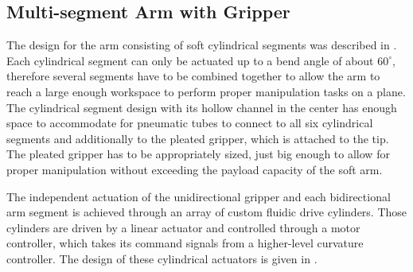 \subsection{Multi-segment Arm with Gripper}

The design for the arm consisting of soft cylindrical segments was described in \cite{marchese2014whole}.
Each cylindrical segment can only be actuated up to a bend angle of about $60^\circ$, therefore several segments have to be combined together to allow the arm to reach a large enough workspace to perform proper manipulation tasks on a plane. 
The cylindrical segment design with its hollow channel in the center has enough space to accommodate for pneumatic tubes to connect to all six cylindrical segments and additionally to the pleated gripper, which is attached to the tip. 
The pleated gripper has to be appropriately sized, just big enough to allow for proper manipulation without exceeding the payload capacity of the soft arm.


The independent actuation of the unidirectional gripper and each bidirectional arm segment is achieved through an array of custom fluidic drive cylinders.
Those cylinders are driven by a linear actuator and controlled through a motor controller, which takes its command signals from a higher-level curvature controller. 
The design of these cylindrical actuators is given in \cite{marchese2014design}.